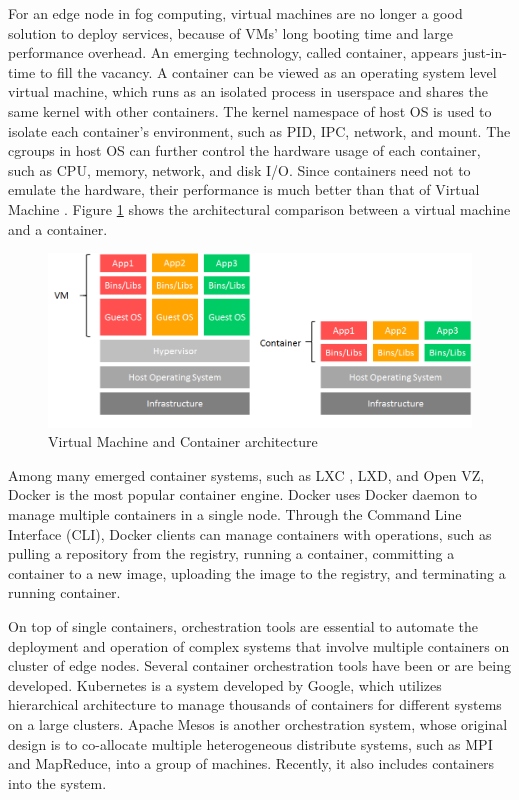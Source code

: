 For an edge node in fog computing, virtual machines are no longer a good solution to deploy services, because of VMs' long booting time and large performance overhead.  An emerging technology, called container, appears just-in-time to fill the vacancy.  A container \cite{soltesz2007container} can be viewed as an operating system level virtual machine, which runs as an isolated process in userspace and shares the same kernel with other containers.  The kernel namespace \cite{biederman2006multiple} of host OS is used to isolate each container's environment, such as PID, IPC, network, and mount.  The cgroups in host OS can further control the hardware usage of each container, such as CPU, memory, network, and disk I/O.  Since containers need not to emulate the hardware, their performance is much better than that of Virtual Machine \cite{xavier2013performance, dua2014virtualization, joy2015performance}.  Figure \ref{fig:VM_vs_container} shows the architectural comparison between a virtual machine and a container.

\begin{figure}[h]
\begin{center}
\includegraphics[width=15cm]{figure/VM_vs_container.png}
\end{center}
\caption{Virtual Machine and Container architecture}
\label{fig:VM_vs_container}
\end{figure}

Among many emerged container systems, such as LXC \cite{helsley2009lxc}, LXD, and Open VZ, Docker \cite{merkel2014docker} is the most popular container engine.  Docker uses Docker daemon to manage multiple containers in a single node.  Through the Command Line Interface (CLI), Docker clients can manage containers with operations, such as pulling a repository from the registry, running a container, committing a container to a new image, uploading the image to the registry, and terminating a running container.

On top of single containers, orchestration tools are essential to automate the deployment and operation of complex systems that involve multiple containers on cluster of edge nodes.  Several container orchestration tools have been or are being developed.  Kubernetes  \cite{bernstein2014containers} is a system developed by Google, which utilizes hierarchical architecture to manage thousands of containers for different systems on a large clusters. Apache Mesos  \cite{hindman2011mesos} is another orchestration system, whose original design is to co-allocate multiple heterogeneous distribute systems, such as MPI and MapReduce, into a group of machines.  Recently, it also includes containers into the system.

